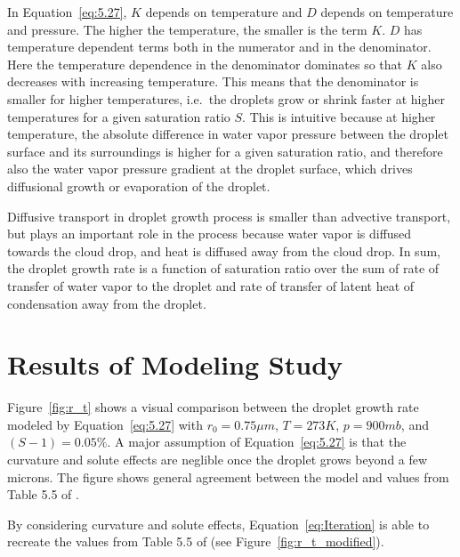 \documentclass[]{article}
\begin{document}
In Equation~\eqref{eq:5.27}, $K$ depends on temperature and $D$
depends on temperature and pressure. The higher the temperature, the smaller is
the term $K$. $D$ has temperature dependent terms both in the numerator and in
the denominator. Here the temperature dependence in the denominator dominates
so that $K$ also decreases with increasing temperature. This means that the
denominator is smaller for higher temperatures, i.e.\ the droplets grow or
shrink faster at higher temperatures for a given saturation ratio $S$. This is
intuitive because at higher temperature, the absolute difference in water vapor
pressure between the droplet surface and its surroundings is higher for a given
saturation ratio, and therefore also the water vapor pressure gradient at the droplet
surface, which drives diffusional growth or evaporation of the droplet.

Diffusive transport in droplet growth process is smaller than advective
transport, but plays an important role in the process because water vapor is
diffused towards the cloud drop, and heat is diffused away from the cloud drop.
In sum, the droplet growth rate is a function of saturation ratio over the sum
of rate of transfer of water vapor to the droplet and rate of transfer of
latent heat of condensation away from the droplet.


\section{Results of Modeling Study}
Figure~\ref{fig:r_t} shows a visual comparison between the droplet growth rate
modeled by Equation~\eqref{eq:5.27} with $r_0 = 0.75 \mu m$, $T=273 K$, $p=900
mb$, and $(S - 1) = 0.05\%$. A major assumption of Equation~\eqref{eq:5.27} is
that the curvature and solute effects are neglible once the droplet grows
beyond a few microns. The figure shows general agreement between the model and
values from Table 5.5 of \cite{Curry}.

By considering curvature and solute effects, Equation~\eqref{eq:Iteration} is
able to recreate the values from Table 5.5 of \cite{Curry} (see
Figure~\ref{fig:r_t_modified}).
\end{document}

